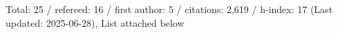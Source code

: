 Total: 25 / refereed: 16 / first author: 5 / citations: 2,619 / h-index: 17 (Last updated: 2025-06-28), List attached below